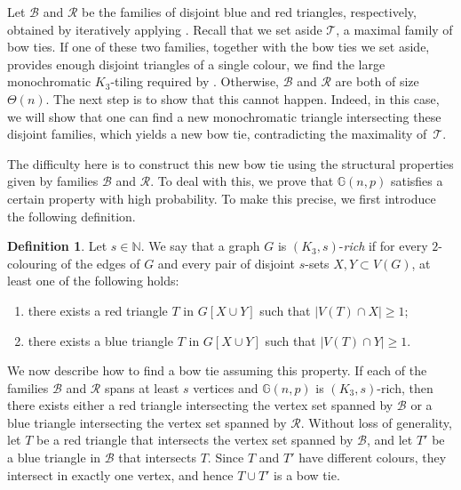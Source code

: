 \documentclass[a4paper,reqno,11pt]{amsart}
\theoremstyle{definition}
\newtheorem{definition}[theorem]{Definition}
\theoremstyle{remark}
\newcommand\cB{\mathcal{B}}
\newcommand\cR{\mathcal{R}}
\renewcommand\ge{\geqslant}
\begin{document}
Let $\cB$ and $\cR$ be the families of disjoint blue and red triangles, respectively, obtained by iteratively applying . Recall that we set aside $\mathcal{T}$, a maximal family  of bow ties. If one of these two families, together with the bow ties we set aside, provides enough disjoint triangles of a single colour, we find the large monochromatic $K_3$-tiling required by . Otherwise, $\cB$ and $\cR$ are both of size $\Theta(n)$. The next step is to show that this cannot happen. Indeed, in this case, we will show that one can find a new monochromatic triangle intersecting these disjoint families, which yields a new bow tie, contradicting the maximality of~$\mathcal{T}$.

The difficulty here is to construct this new bow tie using the structural properties given by families $\cB$ and $\cR$. To deal with this, we prove that $\mathbb{G}(n,p)$ satisfies a certain property with high probability. To make this precise, we first introduce the following definition.

\begin{definition}\label{def:K3rich}
Let $s \in \mathbb{N}$. We say that a graph $G$ is $(K_3,s)$-\textit{rich} if for every $2$-colouring of the edges of $G$ and every pair of disjoint $s$-sets $X, Y \subset V(G)$, at least one of the following holds:

\begin{enumerate}[label =\textnormal{(\roman*)}]
\item\label{item:2.3.i} there exists a red triangle $T$ in $G[X\cup Y]$ such that $|V(T) \cap X| \ge 1$;
\item\label{item:2.3.ii} there exists a blue triangle $T$ in $G[X\cup Y]$ such that $|V(T) \cap Y| \ge 1$.
\end{enumerate}
\end{definition}

We now describe how to find a bow tie assuming this property. If each of the families $\cB$ and $\cR$ spans at least $s$ vertices and $\mathbb{G}(n,p)$ is $(K_3,s)$-rich, then there exists either a red triangle intersecting the vertex set spanned by $\cB$ or a blue triangle intersecting the vertex set spanned by $\cR$. Without loss of generality, let $T$ be a red triangle that intersects the vertex set spanned by $\cB$, and let $T'$ be a blue triangle in $\cB$ that intersects $T$. Since $T$ and $T'$ have different colours, they intersect in exactly one vertex, and hence $T \cup T'$ is a bow tie.
    
\end{document}
